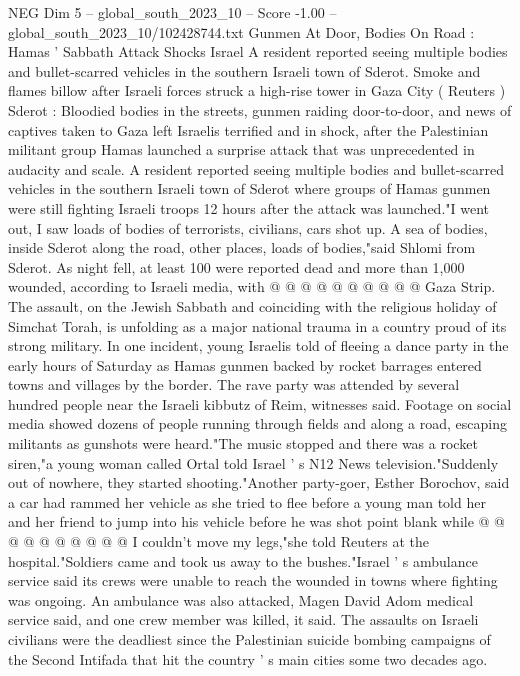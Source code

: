 \begin{textsample}{NEG Dim 5 – global\_south\_2023\_10 – Score -1.00 – global\_south\_2023\_10/102428744.txt}  \label{ex:f5_neg_061}
Gunmen At Door, Bodies On Road : Hamas ' Sabbath Attack Shocks Israel A resident reported seeing multiple bodies and bullet-scarred vehicles in the southern Israeli town of Sderot.
Smoke and flames billow after Israeli forces struck a high-rise tower in Gaza City ( Reuters ) Sderot : Bloodied bodies in the streets, gunmen raiding door-to-door, and news of captives taken to Gaza left Israelis terrified and in shock, after the Palestinian militant group Hamas launched a surprise attack that was unprecedented in audacity and scale.
A resident reported seeing multiple bodies and bullet-scarred vehicles in the southern Israeli town of Sderot where groups of Hamas gunmen were still fighting Israeli troops 12 hours after the attack was launched."I went out, I saw loads of bodies of terrorists, civilians, cars shot up.
A sea of bodies, inside Sderot along the road, other places, loads of bodies,"said Shlomi from Sderot.
As night fell, at least 100 were reported dead and more than 1,000 wounded, according to Israeli media, with @ @ @ @ @ @ @ @ @ @ Gaza Strip.
The assault, on the Jewish Sabbath and coinciding with the religious holiday of Simchat Torah, is unfolding as a major national trauma in a country proud of its strong military.
In one incident, young Israelis told of fleeing a dance party in the early hours of Saturday as Hamas gunmen backed by rocket barrages entered towns and villages by the border.
The rave party was attended by several hundred people near the Israeli kibbutz of Reim, witnesses said.
Footage on social media showed dozens of people running through fields and along a road, escaping militants as gunshots were heard."The music stopped and there was a rocket siren,"a young woman called Ortal told Israel ' s N12 News television."Suddenly out of nowhere, they started shooting."Another party-goer, Esther Borochov, said a car had rammed her vehicle as she tried to flee before a young man told her and her friend to jump into his vehicle before he was shot point blank while @ @ @ @ @ @ @ @ @ @ I couldn't move my legs,"she told Reuters at the hospital."Soldiers came and took us away to the bushes."Israel ' s ambulance service said its crews were unable to reach the wounded in towns where fighting was ongoing.
An ambulance was also attacked, Magen David Adom medical service said, and one crew member was killed, it said.
The assaults on Israeli civilians were the deadliest since the Palestinian suicide bombing campaigns of the Second Intifada that hit the country ' s main cities some two decades ago.

\end{textsample}
